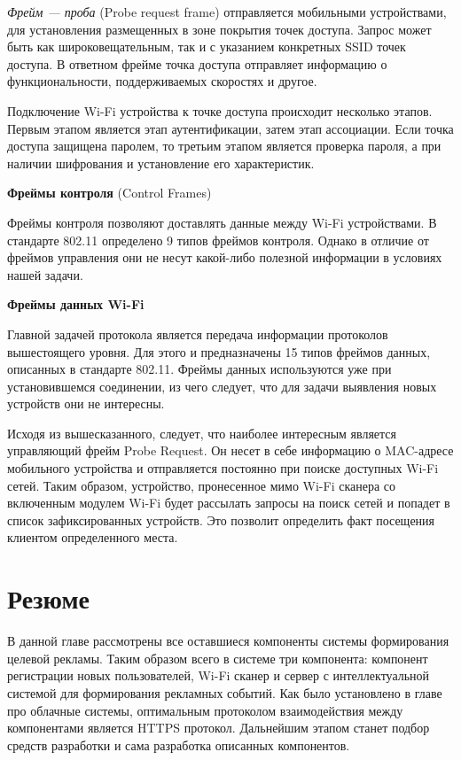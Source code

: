 \textit{Фрейм --- проба} (Probe request frame) отправляется мобильными устройствами, для установления размещенных в зоне покрытия точек доступа. Запрос может быть как широковещательным, так и с указанием конкретных SSID точек доступа. В ответном фрейме точка доступа отправляет информацию о функциональности, поддерживаемых скоростях и другое.

Подключение Wi-Fi устройства к точке доступа происходит несколько этапов. Первым этапом является этап аутентификации, затем этап ассоциации. Если точка доступа защищена паролем, то третьим этапом является проверка пароля, а при наличии шифрования и установление его характеристик.

\textbf{Фреймы контроля} (Control Frames)

Фреймы контроля позволяют доставлять данные между Wi-Fi устройствами. В стандарте 802.11 определено 9 типов фреймов контроля. Однако в отличие от фреймов управления они не несут какой-либо полезной информации в условиях нашей задачи.

\textbf{Фреймы данных Wi-Fi}

Главной задачей протокола является передача информации протоколов вышестоящего уровня. Для этого и предназначены 15 типов фреймов данных, описанных в стандарте 802.11. Фреймы данных используются уже при установившемся соединении, из чего следует, что для задачи выявления новых устройств они не интересны.

Исходя из вышесказанного, следует, что наиболее интересным является управляющий фрейм Probe Request. Он несет в себе информацию о MAC-адресе мобильного устройства и отправляется постоянно при поиске доступных Wi-Fi сетей. Таким образом, устройство, пронесенное мимо Wi-Fi сканера со включенным модулем Wi-Fi будет рассылать запросы на поиск сетей и попадет в список зафиксированных устройств. Это позволит определить факт посещения клиентом определенного места.


\section{Резюме}

В данной главе рассмотрены все оставшиеся компоненты системы формирования целевой рекламы. Таким образом всего в системе три компонента: компонент регистрации новых пользователей, Wi-Fi сканер и сервер с интеллектуальной системой для формирования рекламных событий. Как было установлено в главе про облачные системы, оптимальным протоколом взаимодействия между компонентами является HTTPS протокол. Дальнейшим этапом станет подбор средств разработки и сама разработка описанных компонентов.
